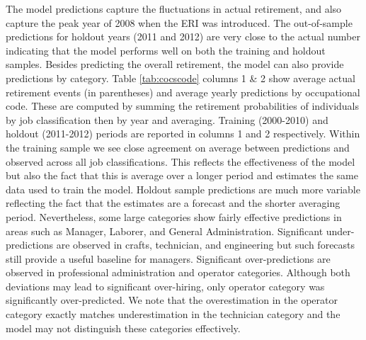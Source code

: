 \documentclass[12pt,letterpaper]{article}
\begin{document}
 The model predictions capture the fluctuations in actual retirement, and also capture the peak year of 2008 when the ERI was introduced. The out-of-sample predictions for holdout years (2011 and 2012) are very close to the actual number indicating that the model performs well on both the training and holdout samples. Besides predicting the overall retirement, the model can also provide predictions by category. Table \ref{tab:cocscode} columns 1 \& 2 show average actual retirement events (in parentheses) and average yearly predictions by occupational code. These are computed by summing the retirement probabilities of individuals by job classification then by year and averaging.  Training (2000-2010) and holdout (2011-2012) periods are reported in columns 1 and 2 respectively.  Within the training sample we see close agreement on average between predictions and observed across all job classifications. This reflects the effectiveness of the model but also the fact that this is average over a longer period and estimates the same data used to train the model.  Holdout sample predictions are much more variable reflecting the fact that the estimates are a forecast and the shorter averaging period.  Nevertheless, some large categories show fairly effective predictions in areas such as Manager, Laborer, and General Administration.  Significant under-predictions are observed in crafts, technician, and engineering but such forecasts still provide a useful baseline for managers.  Significant over-predictions are observed in professional administration and operator categories. Although both deviations may lead to significant over-hiring, only operator category was significantly over-predicted.  We note that the overestimation in the operator category exactly matches underestimation in the technician category and the model may not distinguish these categories effectively.%
\end{document}
